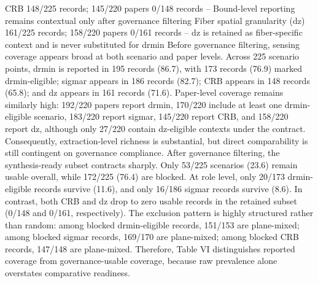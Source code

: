 {}\markdownRendererPipe{} CRB \markdownRendererPipe{} 148/225 records; 145/220 papers \markdownRendererPipe{} 0/148 records \markdownRendererPipe{} -- \markdownRendererPipe{} Bound-level reporting remains contextual only after governance filtering \markdownRendererPipe{}\markdownRendererSoftLineBreak
{}\markdownRendererPipe{} Fiber spatial granularity (\markdownRendererDollarSign{}dz\markdownRendererDollarSign{}) \markdownRendererPipe{} 161/225 records; 158/220 papers \markdownRendererPipe{} 0/161 records \markdownRendererPipe{} -- \markdownRendererPipe{} \markdownRendererDollarSign{}dz\markdownRendererDollarSign{} is retained as fiber-specific context and is never substituted for \markdownRendererDollarSign{}dr\markdownRendererUnderscore{}\markdownRendererLeftBrace{}min\markdownRendererRightBrace{}\markdownRendererDollarSign{} \markdownRendererPipe{}\markdownRendererParagraphSeparator
{}Before governance filtering, sensing coverage appears broad at both scenario and paper levels. Across 225 scenario points, drmin is reported in 195 records (86.7\markdownRendererPercentSign{}), with 173 records (76.9\markdownRendererPercentSign{}) marked drmin-eligible; sigma\markdownRendererUnderscore{}r appears in 186 records (82.7\markdownRendererPercentSign{}); CRB appears in 148 records (65.8\markdownRendererPercentSign{}); and dz appears in 161 records (71.6\markdownRendererPercentSign{}). Paper-level coverage remains similarly high: 192/220 papers report drmin, 170/220 include at least one drmin-eligible scenario, 183/220 report sigma\markdownRendererUnderscore{}r, 145/220 report CRB, and 158/220 report dz, although only 27/220 contain dz-eligible contexts under the contract. Consequently, extraction-level richness is substantial, but direct comparability is still contingent on governance compliance.\markdownRendererParagraphSeparator
{}After governance filtering, the synthesis-ready subset contracts sharply. Only 53/225 scenarios (23.6\markdownRendererPercentSign{}) remain usable overall, while 172/225 (76.4\markdownRendererPercentSign{}) are blocked. At role level, only 20/173 drmin-eligible records survive (11.6\markdownRendererPercentSign{}), and only 16/186 sigma\markdownRendererUnderscore{}r records survive (8.6\markdownRendererPercentSign{}). In contrast, both CRB and dz drop to zero usable records in the retained subset (0/148 and 0/161, respectively). The exclusion pattern is highly structured rather than random: among blocked drmin-eligible records, 151/153 are plane-mixed; among blocked sigma\markdownRendererUnderscore{}r records, 169/170 are plane-mixed; among blocked CRB records, 147/148 are plane-mixed. Therefore, Table VI distinguishes reported coverage from governance-usable coverage, because raw prevalence alone overstates comparative readiness.\markdownRendererParagraphSeparator
